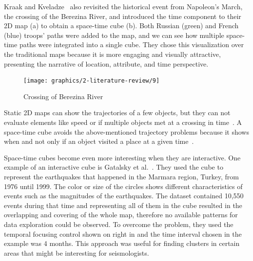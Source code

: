 Kraak and Kveladze~\citep{kraak2017narrative} also revisited the
historical event from Napoleon’s March, the crossing of the Berezina River, and introduced the time component to their
2D map (a) to obtain a space-time cube (b). Both Russian (green) and French (blue) troops’ paths were added to the map, and we
can see how multiple space-time paths were integrated into a single cube. They chose this visualization over the traditional
maps because it is more engaging and visually attractive, presenting the narrative of location, attribute, and time perspective.

\begin{figure}[hbt!]
    \begin{center}
        \texttt{[image: graphics/2-literature-review/9]}
    \end{center}
    \caption{Crossing of Berezina River}
    \label{fig:figure2.11}
\end{figure}

Static 2D maps can show the trajectories of a few objects, but they can
not evaluate elements like speed or if multiple objects met at a crossing in time~\citep{nollenburg2007geographic}.
A space-time cube avoids the above-mentioned trajectory problems because it shows when and not only if an object
visited a place at a given time~\citep{maceachren2005moving}.

Space-time cubes become even more interesting when they are interactive. One example of an interactive cube is Gatalsky et al.~\citep{gatalsky2004interactive}.
They used the cube to represent the earthquakes that happened in the Marmara region, Turkey, from 1976 until 1999. The color or
size of the circles shows different characteristics of events such as the magnitudes of the earthquakes. The dataset contained
10,550 events during that time and representing all of them in the cube resulted in the overlapping and covering of the whole map,
therefore no available patterns for data exploration could be observed. To overcome the problem, they used the temporal focusing
control shown on right in  and the time interval chosen in the example was 4 months. This approach was
useful for finding clusters in certain areas that might be interesting for seismologists.

